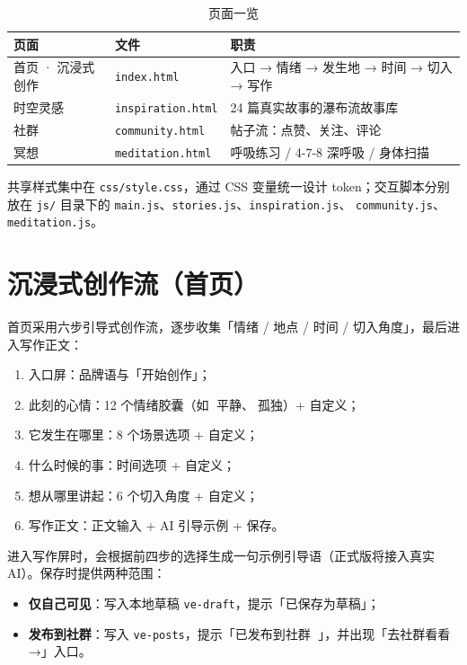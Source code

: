 \documentclass[12pt,a4paper]{ctexart}
\begin{document}
\begin{table}[h]
  \centering
  \begin{tabular}{@{}llp{6.6cm}@{}}
    \toprule
    页面 & 文件 & 职责 \\
    \midrule
    首页 · 沉浸式创作 & \texttt{index.html} & 入口 → 情绪 → 发生地 → 时间 → 切入 → 写作 \\
    时空灵感 & \texttt{inspiration.html} & 24 篇真实故事的瀑布流故事库 \\
    社群 & \texttt{community.html} & 帖子流：点赞、关注、评论 \\
    冥想 & \texttt{meditation.html} & 呼吸练习 / 4-7-8 深呼吸 / 身体扫描 \\
    \bottomrule
  \end{tabular}
  \caption{页面一览}
\end{table}

共享样式集中在 \texttt{css/style.css}，通过 CSS 变量统一设计 token；交互脚本分别放在
\texttt{js/} 目录下的 \texttt{main.js}、\texttt{stories.js}、\texttt{inspiration.js}、
\texttt{community.js}、\texttt{meditation.js}。

\section{沉浸式创作流（首页）}

首页采用六步引导式创作流，逐步收集「情绪 / 地点 / 时间 / 切入角度」，最后进入写作正文：

\begin{enumerate}
  \item 入口屏：品牌语与「开始创作」；
  \item 此刻的心情：12 个情绪胶囊（如 🌿平静、🌙孤独）+ 自定义；
  \item 它发生在哪里：8 个场景选项 + 自定义；
  \item 什么时候的事：时间选项 + 自定义；
  \item 想从哪里讲起：6 个切入角度 + 自定义；
  \item 写作正文：正文输入 + AI 引导示例 + 保存。
\end{enumerate}

进入写作屏时，会根据前四步的选择生成一句示例引导语（正式版将接入真实 AI）。保存时提供两种范围：

\begin{itemize}
  \item \textbf{仅自己可见}：写入本地草稿 \texttt{ve-draft}，提示「已保存为草稿」；
  \item \textbf{发布到社群}：写入 \texttt{ve-posts}，提示「已发布到社群 🎉」，并出现「去社群看看 →」入口。
\end{itemize}
\end{document}
